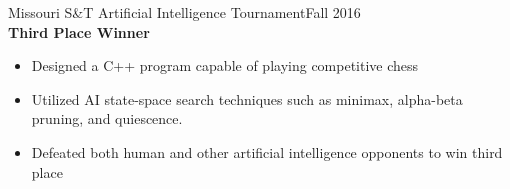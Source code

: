 \documentclass[resmargin]{res}
\begin{document}
\begin{resume}
Missouri S\&T Artificial Intelligence Tournament\hfill Fall 2016\\
{\bf Third Place Winner}
\begin{itemize}
	\item Designed a C++ program capable of playing competitive chess
	\item Utilized AI state-space search techniques such as minimax, alpha-beta pruning, and quiescence.
	\item Defeated both human and other artificial intelligence opponents to win third place
\end{itemize}
\fi

\iffalse
\section{Honors \& Activities}
Missouri S\&T Chancellor's Scholarship\\
Missouri Higher Education Scholarship (Bright Flight)\\
James C. Grimm Electrical \& Computer Engineering Scholarship\\
Tau Beta Pi - National Engineering Honor Society\\
Kappa Kappa Psi - National Honorary Band Fraternity\\
Principal Oboist - Missouri S\&T Symphonic Orchestra and Wind Symphony
\fi

\end{resume}
\end{document}
